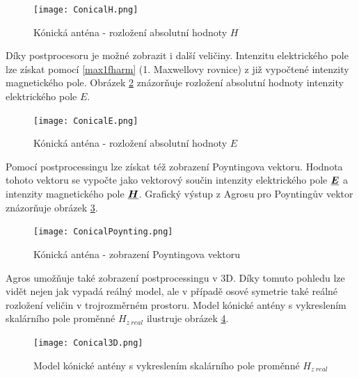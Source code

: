 \documentclass[12pt,a4paper,oneside]{article}
\numberwithin{equation}{section} %
\numberwithin{figure}{section} %
\numberwithin{table}{section} %
\renewcommand{\vec}[1]{\mbox{\boldmath$#1$}} %
\newcommand{\faz}[1]{{\underline{#1}}} %
\begin{document}
\begin{figure}
\begin{center}
\texttt{[image: ConicalH.png]} 
\caption{Kónická anténa - rozložení absolutní hodnoty $H$} 
\label{absH}
\end{center}
\end{figure}

Díky postprocesoru je možné zobrazit i další veličiny. Intenzitu elektrického pole lze získat pomocí \ref{max1fharm} (1. Maxwellovy rovnice) z již vypočtené intenzity magnetického pole. Obrázek \ref{absE} znázorňuje rozložení absolutní hodnoty intenzity elektrického pole $E$.

\begin{figure}
\begin{center}
\texttt{[image: ConicalE.png]} 
\caption{Kónická anténa - rozložení absolutní hodnoty $E$} 
\label{absE}
\end{center}
\end{figure}

Pomocí postprocessingu lze získat též zobrazení Poyntingova vektoru. Hodnota tohoto vektoru se vypočte jako vektorový součin intenzity elektrického pole $\faz{\vec{E}}$ a intenzity magnetického pole $\faz{\vec{H}}$. Grafický výstup z Agrosu pro Poyntingův vektor znázorňuje obrázek \ref{Poynting}. 

\begin{figure}
\begin{center}
\texttt{[image: ConicalPoynting.png]} 
\caption{Kónická anténa - zobrazení Poyntingova vektoru} 
\label{Poynting}
\end{center}
\end{figure}

Agros umožňuje také zobrazení postprocessingu v 3D. Díky tomuto pohledu lze vidět nejen jak vypadá reálný model, ale v případě osové symetrie také reálné rozložení veličin v trojrozměrném prostoru. Model kónické antény s vykreslením skalárního pole proměnné $H _{z~real}$ ilustruje obrázek \ref{Con3D}.

\begin{figure}
\begin{center}
\texttt{[image: Conical3D.png]} 
\caption{Model kónické antény s vykreslením skalárního pole proměnné $H _{z~real}$} 
\label{Con3D}
\end{center}
\end{figure} 
\end{document}
